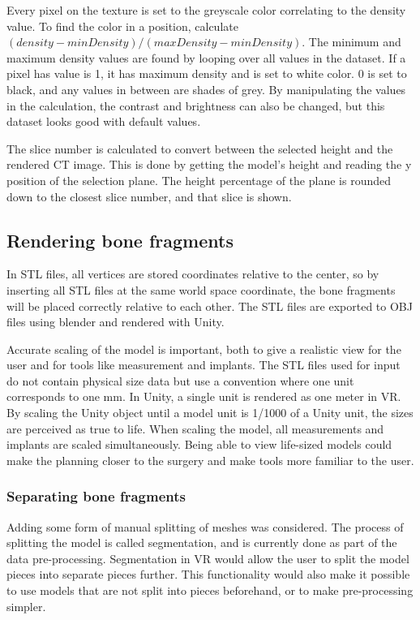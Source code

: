 \documentclass[a4paper]{report}
\begin{document}
Every pixel on the texture is set to the greyscale color correlating to the density value. To find the color in a position, calculate $(density-minDensity)/(maxDensity-minDensity)$. The minimum and maximum density values are found by looping over all values in the dataset.
If a pixel has value is 1, it has maximum density and is set to white color. 0 is set to black, and any values in between are shades of grey.
By manipulating the values in the calculation, the contrast and brightness can also be changed, but this dataset looks good with default values.


The slice number is calculated to convert between the selected height and the rendered CT image. This is done by getting the model's height and reading the y position of the selection plane. The height percentage of the plane is rounded down to the closest slice number, and that slice is shown.

\subsection{Rendering bone fragments}
In STL files, all vertices are stored coordinates relative to the center, so by inserting all STL files at the same world space coordinate, the bone fragments will be placed correctly relative to each other. The STL files are exported to OBJ files using blender and rendered with Unity.

Accurate scaling of the model is important, both to give a realistic view for the user and for tools like measurement and implants. The STL files used for input do not contain physical size data but use a convention where one unit corresponds to one mm. In Unity, a single unit is rendered as one meter in VR. By scaling the Unity object until a model unit is 1/1000 of a Unity unit, the sizes are perceived as true to life. When scaling the model, all measurements and implants are scaled simultaneously.
Being able to view life-sized models could make the planning closer to the surgery and make tools more familiar to the user.

\subsubsection{Separating bone fragments}
Adding some form of manual splitting of meshes was considered. The process of splitting the model is called segmentation, and is currently done as part of the data pre-processing. Segmentation in VR would allow the user to split the model pieces into separate pieces further. This functionality would also make it possible to use models that are not split into pieces beforehand, or to make pre-processing simpler.
\end{document}
